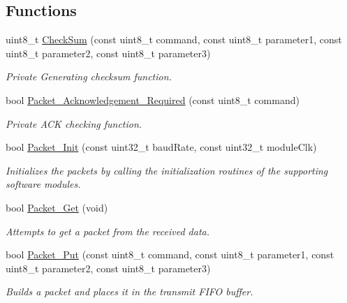 \subsection*{Functions}
\begin{DoxyCompactItemize}
\item 
uint8\+\_\+t \hyperlink{group__packet__module_ga32abc25e2e7edcf4baa2cb9df991239c}{Check\+Sum} (const uint8\+\_\+t command, const uint8\+\_\+t parameter1, const uint8\+\_\+t parameter2, const uint8\+\_\+t parameter3)
\begin{DoxyCompactList}\small\item\em Private Generating checksum function. \end{DoxyCompactList}\item 
bool \hyperlink{group__packet__module_ga6e29b4c842299ec1e69d03dae775e0e9}{Packet\+\_\+\+Acknowledgement\+\_\+\+Required} (const uint8\+\_\+t command)
\begin{DoxyCompactList}\small\item\em Private A\+C\+K checking function. \end{DoxyCompactList}\item 
bool \hyperlink{group__packet__module_ga414aa3f521fdfd6e4586d98a946b6ab2}{Packet\+\_\+\+Init} (const uint32\+\_\+t baud\+Rate, const uint32\+\_\+t module\+Clk)
\begin{DoxyCompactList}\small\item\em Initializes the packets by calling the initialization routines of the supporting software modules. \end{DoxyCompactList}\item 
bool \hyperlink{group__packet__module_gac58a17928cd5e556e1567b2fde9f88f0}{Packet\+\_\+\+Get} (void)
\begin{DoxyCompactList}\small\item\em Attempts to get a packet from the received data. \end{DoxyCompactList}\item 
bool \hyperlink{group__packet__module_ga431a1e1da25a8214a502ec81f88fc3f1}{Packet\+\_\+\+Put} (const uint8\+\_\+t command, const uint8\+\_\+t parameter1, const uint8\+\_\+t parameter2, const uint8\+\_\+t parameter3)
\begin{DoxyCompactList}\small\item\em Builds a packet and places it in the transmit F\+I\+F\+O buffer. \end{DoxyCompactList}\end{DoxyCompactItemize}
